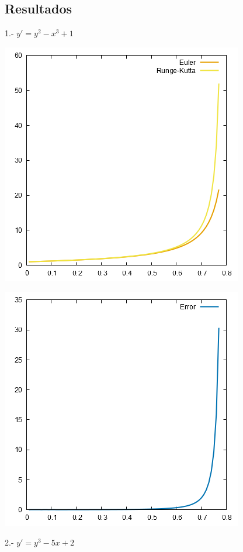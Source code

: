 \documentclass[10pt]{article}
\begin{document}
\begin{multicols}{2}
		\subsection{Resultados}
			1.- $y'=y^2-x^3+1$
			\begin{center}
				\includegraphics[scale=0.4]{../Graficas/1.png}
			\end{center}
			\begin{center}
				\includegraphics[scale=0.4]{../Graficas/1_1.png}
			\end{center}
			2.- $y'=y^3-5x+2$
			\begin{center}

\end{center}
\end{multicols}
\end{document}
